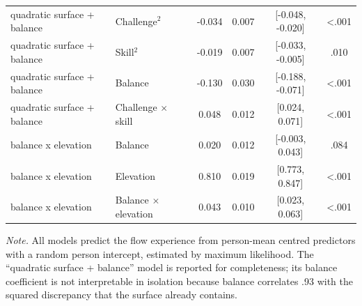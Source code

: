 \begin{table}[!htbp]
\begin{tabular*}{\textwidth}{@{\extracolsep{\fill}}llcccc@{}}
quadratic surface + balance & Challenge$^2$ & -0.034 & 0.007 & [-0.048, -0.020] & <.001 \\
quadratic surface + balance & Skill$^2$ & -0.019 & 0.007 & [-0.033, -0.005] & .010 \\
quadratic surface + balance & Balance & -0.130 & 0.030 & [-0.188, -0.071] & <.001 \\
quadratic surface + balance & Challenge $\times$ skill & 0.048 & 0.012 & [0.024, 0.071] & <.001 \\
balance x elevation & Balance & 0.020 & 0.012 & [-0.003, 0.043] & .084 \\
balance x elevation & Elevation & 0.810 & 0.019 & [0.773, 0.847] & <.001 \\
balance x elevation & Balance $\times$ elevation & 0.043 & 0.010 & [0.023, 0.063] & <.001 \\
\bottomrule
\end{tabular*}
\par\vspace{3pt}\noindent\parbox{\textwidth}{\footnotesize\textit{Note.} All models predict the flow experience from person-mean centred predictors with a random person intercept, estimated by maximum likelihood. The ``quadratic surface + balance'' model is reported for completeness; its balance coefficient is not interpretable in isolation because balance correlates .93 with the squared discrepancy that the surface already contains.}
\endgroup
\end{table}
